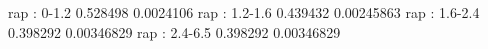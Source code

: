 rap : 0-1.2
0.528498 0.0024106
rap : 1.2-1.6
0.439432 0.00245863
rap : 1.6-2.4
0.398292 0.00346829
rap : 2.4-6.5
0.398292 0.00346829
